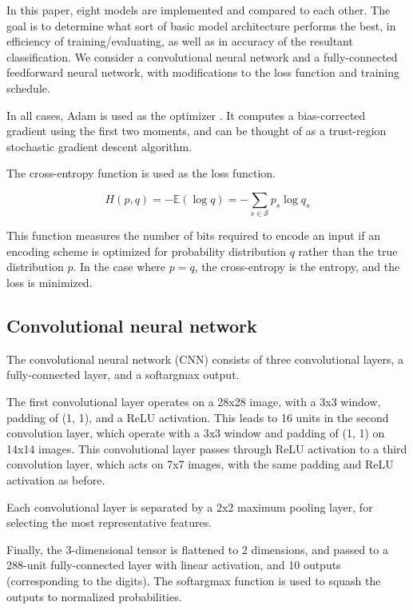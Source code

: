 \documentclass{article}
\begin{document}
In this paper, eight models are implemented and compared to each other.
The goal is to determine what sort of basic model architecture performs the best,
in efficiency of training/evaluating, as well as in accuracy of the resultant classification.
We consider a convolutional neural network and a fully-connected feedforward neural network,
with modifications to the loss function and training schedule.

In all cases, Adam is used as the optimizer \citep{kingmaAdamMethodStochastic2017}.
It computes a bias-corrected gradient using the first two moments,
and can be thought of as a trust-region stochastic gradient descent algorithm.

The cross-entropy function is used as the loss function.

\begin{equation}
  H(p, q) = - \mathbb{E}(\log q) = - \sum_{s \in \mathcal{S}} p_s \log q_s
\end{equation}

This function measures the number of bits required to encode an input
if an encoding scheme is optimized for probability distribution $q$ rather than
the true distribution $p$.
In the case where $p = q$, the cross-entropy is the entropy,
and the loss is minimized.

\subsection{Convolutional neural network}

The convolutional neural network (CNN) consists of three convolutional layers,
a fully-connected layer, and a softargmax output.

The first convolutional layer operates on a 28x28 image, with a 3x3 window,
padding of (1, 1), and a ReLU activation.
This leads to 16 units in the second convolution layer,
which operate with a 3x3 window and padding of (1, 1) on 14x14 images.
This convolutional layer passes through ReLU activation to a third convolution layer,
which acts on 7x7 images, with the same padding and ReLU activation as before.

Each convolutional layer is separated by a 2x2 maximum pooling layer,
for selecting the most representative features.

Finally, the 3-dimensional tensor is flattened to 2 dimensions,
and passed to a 288-unit fully-connected layer with linear activation,
and 10 outputs (corresponding to the digits).
The softargmax function is used to squash the outputs to normalized probabilities.
\end{document}
